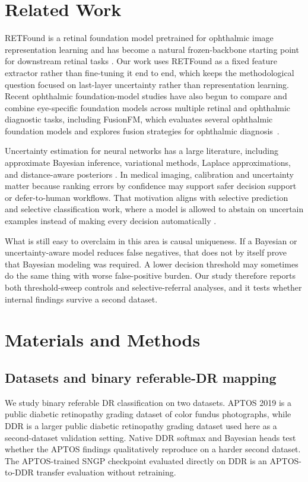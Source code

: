 \documentclass[11pt]{article}
\begin{document}
\section{Related Work}
RETFound is a retinal foundation model pretrained for ophthalmic image representation learning and has become a natural frozen-backbone starting point for downstream retinal tasks \citep{zhou2023retfound}. Our work uses RETFound as a fixed feature extractor rather than fine-tuning it end to end, which keeps the methodological question focused on last-layer uncertainty rather than representation learning.
Recent ophthalmic foundation-model studies have also begun to compare and combine eye-specific foundation models across multiple retinal and ophthalmic diagnostic tasks, including FusionFM, which evaluates several ophthalmic foundation models and explores fusion strategies for ophthalmic diagnosis~\citep{zou2025fusionfm}.

Uncertainty estimation for neural networks has a large literature, including approximate Bayesian inference, variational methods, Laplace approximations, and distance-aware posteriors \citep{neal1996bayesian,blundell2015weightuncertainty,ritter2018scalable,daxberger2021laplace,liu2020simple}. In medical imaging, calibration and uncertainty matter because ranking errors by confidence may support safer decision support or defer-to-human workflows. That motivation aligns with selective prediction and selective classification work, where a model is allowed to abstain on uncertain examples instead of making every decision automatically \citep{elyaniv2010foundation,geifman2017selective}.

What is still easy to overclaim in this area is causal uniqueness. If a Bayesian or uncertainty-aware model reduces false negatives, that does not by itself prove that Bayesian modeling was required. A lower decision threshold may sometimes do the same thing with worse false-positive burden. Our study therefore reports both threshold-sweep controls and selective-referral analyses, and it tests whether internal findings survive a second dataset.

\section{Materials and Methods}

\subsection{Datasets and binary referable-DR mapping}
We study binary referable DR classification on two datasets. APTOS 2019 is a public diabetic retinopathy grading dataset of color fundus photographs, while DDR is a larger public diabetic retinopathy grading dataset used here as a second-dataset validation setting. Native DDR softmax and Bayesian heads test whether the APTOS findings qualitatively reproduce on a harder second dataset. The APTOS-trained SNGP checkpoint evaluated directly on DDR is an APTOS-to-DDR transfer evaluation without retraining.
\end{document}
